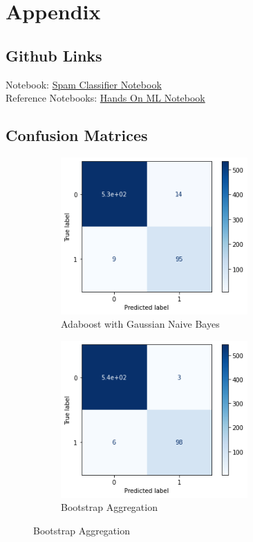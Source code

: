 \section{Appendix}
\subsection{Github Links}
Notebook: \href{https://github.com/Zeddling/Hands\_On\_ML/blob/classification/Classification/exercises/spam\_classification/Spam\_Classification/SpamClassifier.ipynb}{Spam Classifier Notebook}\\
Reference Notebooks: \href{https://github.com/ageron/handson-ml2/blob/master/03\_classification.ipynb}{Hands On ML Notebook}
\subsection{Confusion Matrices}
\begin{figure}[H]
    \begin{subfigure}{0.5\textwidth}
        \includegraphics[width=0.9\linewidth, height=6cm]{img/cm/adb.png}
        \caption{Adaboost with Gaussian Naive Bayes}
        \label{fig:adb}
    \end{subfigure}
    \begin{subfigure}{0.5\textwidth}
        \includegraphics[width=0.9\linewidth, height=6cm]{img/cm/bag.png}
        \caption{Bootstrap Aggregation}
        \label{fig:bag}
    \end{subfigure}
\end{figure}
